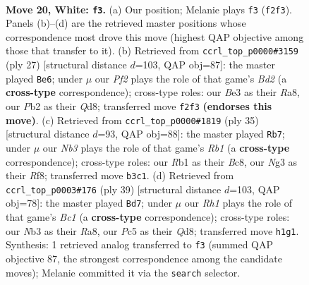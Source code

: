 \documentclass[11pt]{article}
\begin{document}
\clearpage

\begin{figure}[p]\centering
\begin{subfigure}{0.46\textwidth}\centering
\resizebox{\linewidth}{!}{%
\newchessgame
\chessboard[
  setfen={r1b2kr1/1pqnbp1p/p3n1p1/2Pp4/8/1NK1B1N1/PP3PPP/1R1Q1B1R w - - 8 20},
  showmover=false,
  pgfstyle=straightmove, color=movearrow, markmove={f2-f3}
]}
\caption{}
\end{subfigure}\hfill
\begin{subfigure}{0.46\textwidth}\centering
\resizebox{\linewidth}{!}{%
\newchessgame
\chessboard[
  setfen={r2q1rk1/pppb2bp/2np2p1/3N3n/4PP2/Q7/PPPB4/2KR1BNR b - - 0 14},
  showmover=false,
  pgfstyle=straightmove, color=movearrow, markmove={d7-e6}
]}
\caption{}
\end{subfigure}
\\[4pt]
\begin{subfigure}{0.46\textwidth}\centering
\resizebox{\linewidth}{!}{%
\newchessgame
\chessboard[
  setfen={1rb2rk1/p2n1pp1/q3pn1p/1p6/1QpNP3/P4P2/1P2BBPP/3RK2R b K - 3 18},
  showmover=false,
  pgfstyle=straightmove, color=movearrow, markmove={b8-b7}
]}
\caption{}
\end{subfigure}\hfill
\begin{subfigure}{0.46\textwidth}\centering
\resizebox{\linewidth}{!}{%
\newchessgame
\chessboard[
  setfen={r1bq1bk1/1p3ppp/2p2nn1/p7/Q7/PNN1P1PP/1P3PB1/2BR2K1 b - - 1 20},
  showmover=false,
  pgfstyle=straightmove, color=movearrow, markmove={c8-d7}
]}
\caption{}
\end{subfigure}
\caption{\textbf{Move 20, White: \texttt{f3}.} (a) Our position; Melanie plays \texttt{f3} (\texttt{f2f3}). Panels (b)--(d) are the retrieved master positions whose correspondence most drove this move (highest QAP objective among those that transfer to it). (b) Retrieved from \texttt{ccrl\_top\_p0000\#3159} (ply 27) [structural distance $d$=103, QAP obj=87]: the master played \texttt{Be6}; under $\mu$ our \emph{Pf2} plays the role of that game's \emph{Bd2} (a \textbf{cross-type} correspondence); cross-type roles: our \emph{B}e3 as their \emph{R}a8, our \emph{P}b2 as their \emph{Q}d8; transferred move \texttt{f2f3} \textbf{(endorses this move)}. (c) Retrieved from \texttt{ccrl\_top\_p0000\#1819} (ply 35) [structural distance $d$=93, QAP obj=88]: the master played \texttt{Rb7}; under $\mu$ our \emph{Nb3} plays the role of that game's \emph{Rb1} (a \textbf{cross-type} correspondence); cross-type roles: our \emph{R}b1 as their \emph{B}c8, our \emph{N}g3 as their \emph{R}f8; transferred move \texttt{b3c1}. (d) Retrieved from \texttt{ccrl\_top\_p0003\#176} (ply 39) [structural distance $d$=103, QAP obj=78]: the master played \texttt{Bd7}; under $\mu$ our \emph{Rh1} plays the role of that game's \emph{Bc1} (a \textbf{cross-type} correspondence); cross-type roles: our \emph{N}b3 as their \emph{R}a8, our \emph{P}c5 as their \emph{Q}d8; transferred move \texttt{h1g1}. Synthesis: 1 retrieved analog transferred to \texttt{f3} (summed QAP objective 87, the strongest correspondence among the candidate moves); Melanie committed it via the \texttt{search} selector.}
\label{fig:thought-m38}
\end{figure}
\end{document}
